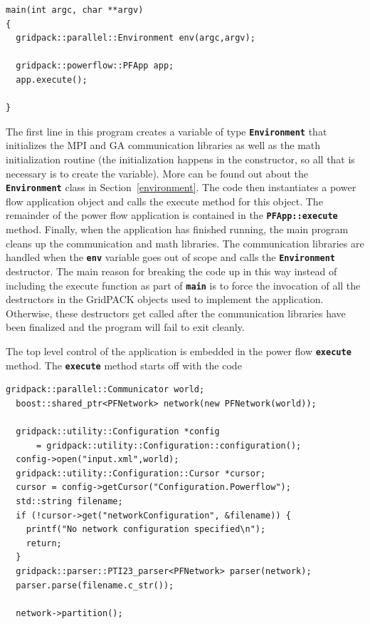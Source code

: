 {
\color{red}
\begin{Verbatim}[fontseries=b]
main(int argc, char **argv)
{
  gridpack::parallel::Environment env(argc,argv);

  gridpack::powerflow::PFApp app;
  app.execute();

}
\end{Verbatim}
}

The first line in this program creates a variable of type
\texttt{\textbf{Environment}} that initializes the MPI and GA communication
libraries as well as the math initialization routine (the initialization
happens in the constructor, so all that is necessary is to create the variable).
More can be found out about the \texttt{\textbf{Environment}} class in
Section~\ref{environment}.
The code then instantiates a power flow application object and calls the execute method for this object. The remainder of the power flow application is contained in the \texttt{\textbf{PFApp::execute}} method. Finally, when the application has finished running, the main program cleans up the communication and math libraries. The communication libraries are handled when the \texttt{\textbf{env}} variable goes out of scope and calls the \texttt{\textbf{Environment}} destructor. The main reason for breaking the code up in this way instead of including the execute function as part of \texttt{\textbf{main}} is to force the invocation of all the destructors in the GridPACK objects used to implement the application. Otherwise, these destructors get called after the communication libraries have been finalized and the program will fail to exit cleanly.

The top level control of the application is embedded in the power flow \texttt{\textbf{execute}} method. The \texttt{\textbf{execute}} method starts off with the code

{
\color{red}
\begin{Verbatim}[fontseries=b]
  gridpack::parallel::Communicator world;
  boost::shared_ptr<PFNetwork> network(new PFNetwork(world));

  gridpack::utility::Configuration *config
      = gridpack::utility::Configuration::configuration();
  config->open("input.xml",world);
  gridpack::utility::Configuration::Cursor *cursor;
  cursor = config->getCursor("Configuration.Powerflow");
  std::string filename;
  if (!cursor->get("networkConfiguration", &filename)) {
    printf("No network configuration specified\n");
    return;
  }
  gridpack::parser::PTI23_parser<PFNetwork> parser(network);
  parser.parse(filename.c_str());
  
  network->partition();
\end{Verbatim}
}


